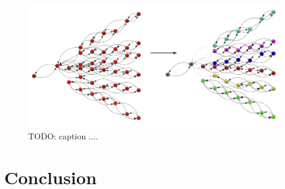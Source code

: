 \begin{figure}[htbp]
   \centering
   \includegraphics[width=0.99\textwidth]{images/7-results/community-detection.png}
   \caption{TODO: caption ....}
   \label{fig:community-detection}%
\end{figure}





\section{Conclusion}




